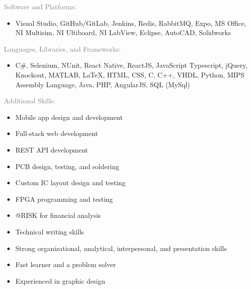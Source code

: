 \documentclass[letterpage]{article}
\begin{document}
\begin{minipage}[t]{0.424\linewidth}
\begin{minipage}[]{0.85\linewidth}
\raggedright
\textcolor{gray}{Software and Platforms:}
\begin{itemize}[label={},leftmargin=*,labelindent=5mm]
\item
Visual Studio,
GitHub/GitLab,
Jenkins,
Redis,
RabbitMQ,
Expo,
MS Office,
NI Multisim,
NI Ultiboard,
NI LabView,
Eclipse,
AutoCAD, 
Solidworks
\end{itemize}
\vspace{7px}
\textcolor{gray}{Languages, Libraries, and Frameworks:}\\
\begin{itemize}[label={},leftmargin=*,labelindent=5mm]
\item
C\#,
Selenium,
NUnit,
React Native,
ReactJS,
JavaScript
Typescript,
jQuery,
Knockout,
MATLAB,
LaTeX,
HTML,
CSS,
C,
C++,
VHDL,
Python,
MIPS Assembly Language,
Java,
PHP,
AngularJS,
SQL (MySql)
\end{itemize}
\vspace{7px}
\textcolor{gray}{Additional Skills:}
\begin{itemize}[leftmargin=*,labelindent=5mm,labelsep=7mm]
\renewcommand\labelitemi{\rule[1mm]{0.33mm}{0.33mm}}
\renewcommand\labelitemii{$\blacksquare$} 
\item
  Mobile app design and development
\item
  Full-stack web development
\item
  REST API development
\item
  PCB design, testing, and soldering
\item
  Custom IC layout design and testing

\item
  FPGA programming and testing
\item
  @RISK for financial analysis
\item
  Technical writing skills
\item
  Strong organizational, analytical, interpersonal,
  and presentation skills
\item
  Fast learner and a problem solver
\item
  Experienced in graphic design
\end{itemize}
\end{minipage}

\end{minipage}
\end{document}
